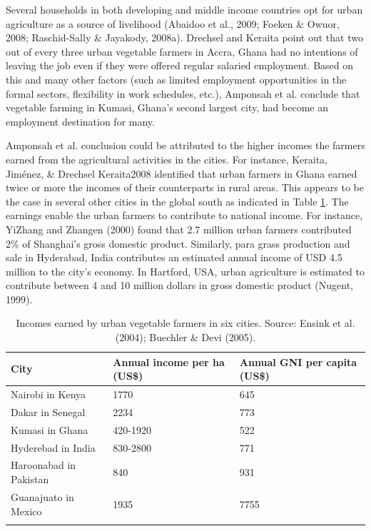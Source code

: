 Several households in both developing and middle income countries opt for urban agriculture as a source of livelihood (Abaidoo et al., 2009; Foeken \& Owuor, 2008; Raschid-Sally \& Jayakody, 2008a). Drechsel and Keraita \cite{Drechsel2014} point out that two out of every three urban vegetable farmers in Accra, Ghana had no intentions of leaving the job even if they were offered regular salaried employment. Based on this and many other factors (such as limited employment opportunities in the formal sectors, flexibility in work schedules, etc.), Amponsah et al. \cite{Amponsah2015} conclude that vegetable farming in Kumasi, Ghana's second largest city, had become an employment destination for many.

Amponsah et al. \cite{Amponsah2015} conclusion could be attributed to the higher incomes the farmers earned from the agricultural activities in the cities. For instance, Keraita, Jiménez, \& Drechsel Keraita2008 identified that urban farmers in Ghana earned twice or more the incomes of their counterparts in rural areas. This appears to be the case in several other cities in the global south as indicated in Table \ref{tbl:incomesByUfarmens}. The earnings enable the urban farmers to contribute to national income. For instance, YiZhang and Zhangen (2000) found that 2.7 million urban farmers contributed 2\% of Shanghai's gross domestic product. Similarly, para grass production and sale in Hyderabad, India contributes an estimated annual income of USD 4.5 million to the city's economy. In Hartford, USA, urban agriculture is estimated to contribute between 4 and 10 million dollars in gross domestic product (Nugent, 1999).

\begin{table}[th]
\caption{Incomes earned by urban vegetable farmers in six cities. \cite{Keraita2008, Drechsel2014} Source: Ensink et al. (2004); Buechler \& Devi (2005).}
\begin{center}
\begin{tabular}{ p{} p{} p{} } 
\hline
City & Annual income per ha (US\$) & Annual GNI per capita (US\$) \\
\hline
Nairobi in Kenya & 1770 & 645 \\
Dakar in Senegal & 2234 & 773 \\
Kumasi in Ghana & 420-1920 & 522 \\
Hyderebad in India & 830-2800 & 771 \\
Haroonabad in Pakistan & 840 & 931 \\
Guanajuato in Mexico & 1935 & 7755 \\
\hline
\label{tbl:incomesByUfarmens}
\end{tabular}
\end{center}
\end{table}

